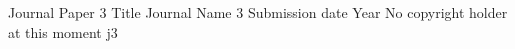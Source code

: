 \documentclass[dissertation,draft]{aaltoseries}
\begin{document}
{Journal Paper 3 Title}
{Journal Name 3}
{}
{Submission date}
{Year}
{No copyright holder at this moment}
{j3}
\end{document}
